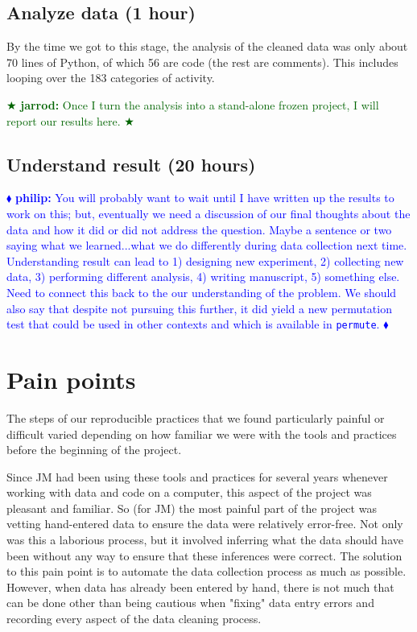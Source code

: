 \documentclass[]{article}
\newcommand{\philip}[1] { \textcolor{blue} {
\ensuremath{\blacklozenge} {\bf philip:}  {#1}
\ensuremath{\blacklozenge} } }
\newcommand{\jarrod}[1] { \textcolor{darkgreen} {
\ensuremath{\bigstar} {\bf jarrod:}  {#1}
\ensuremath{\bigstar} } }
\begin{document}
\subsection{Analyze data (1 hour)}

By the time we got to this stage, the analysis of the cleaned data was only
about 70 lines of Python, of which 56 are code (the rest are comments).
This includes looping over the 183 categories of activity.

\jarrod{Once I turn the analysis into a stand-alone frozen project, I
will report our results here.}

\subsection{Understand result (20 hours)}

\philip{You will probably want to wait until I have written up the results to
work on this; but, eventually we need a discussion of our final thoughts about
the data and how it did or did not address the question.  Maybe a sentence or
two saying what we learned...what we do differently during data collection next
time.  Understanding result can lead to 1) designing new experiment, 2)
collecting new data, 3) performing different analysis, 4) writing manuscript,
5) something else.  Need to connect this back to the our understanding of the
problem.  We should also say that despite not pursuing this further, it did
yield a new permutation test that could be used in other contexts and which is
available in \texttt{permute}.  }

\section{Pain points}\label{pain-points}


The steps of our reproducible practices that we found particularly painful or
difficult varied depending on how familiar we were with the tools and practices
before the beginning of the project.

Since JM had been using these tools and practices for several years whenever
working with data and code on a computer, this aspect of the project was
pleasant and familiar.
So (for JM) the most painful part of the project was vetting hand-entered data
to ensure the data were relatively error-free.
Not only was this a laborious process, but it involved inferring what the data
should have been without any way to ensure that these inferences were correct.
The solution to this pain point is to automate the data collection process as
much as possible.
However, when data has already been entered by hand, there is not much that can
be done other than being cautious when "fixing" data entry errors and recording
every aspect of the data cleaning process.
\end{document}
